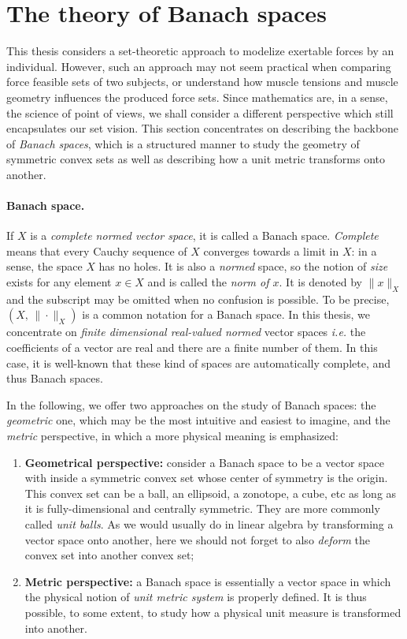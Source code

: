 \section{The theory of Banach spaces}
\label{sec:theory_banach_spaces}
This thesis considers a set-theoretic approach to modelize exertable forces by an individual. However, such an approach may not seem practical when comparing force feasible sets of two subjects, or understand how muscle tensions and muscle geometry influences the produced force sets. Since mathematics are, in a sense, the science of point of views, we shall consider a different perspective which still encapsulates our set vision. This section concentrates on describing the backbone of \emph{Banach spaces}, which is a structured manner to study the geometry of symmetric convex sets as well as describing how a unit metric transforms onto another.

\paragraph*{Banach space.} If $X$ is a \emph{complete normed vector space}, it is called a Banach space. \emph{Complete} means that every Cauchy sequence of $X$ converges towards a limit in $X$: in a sense, the space $X$ has no holes. It is also a \emph{normed} space, so the notion of \emph{size} exists for any element $x\in X$ and is called the \emph{norm of $x$}. It is denoted by $\|x\|_X$ and the subscript may be omitted when no confusion is possible. To be precise, $(X,\, \|\cdot \|_X)$ is a common notation for a Banach space. In this thesis, we concentrate on \emph{finite dimensional real-valued normed} vector spaces \emph{i.e.} the coefficients of a vector are real and there are a finite number of them. In this case, it is well-known that these kind of spaces are automatically complete, and thus Banach spaces.

In the following, we offer two approaches on the study of Banach spaces: the \emph{geometric} one, which may be the most intuitive and easiest to imagine, and the \emph{metric} perspective, in which a more physical meaning is emphasized:
\begin{enumerate}
    \item {\textbf{Geometrical perspective:} consider a Banach space to be a vector space with inside a symmetric convex set whose center of symmetry is the origin. This convex set can be a ball, an ellipsoid, a zonotope, a cube, etc as long as it is fully-dimensional and centrally symmetric. They are more commonly called \emph{unit balls}. As we would usually do in linear algebra by transforming a vector space onto another, here we should not forget to also \emph{deform} the convex set into another convex set;}
    \item {\textbf{Metric perspective:} a Banach space is essentially a vector space in which the physical notion of \emph{unit metric system} is properly defined. It is thus possible, to some extent, to study how a physical unit measure is transformed into another.}
\end{enumerate}

